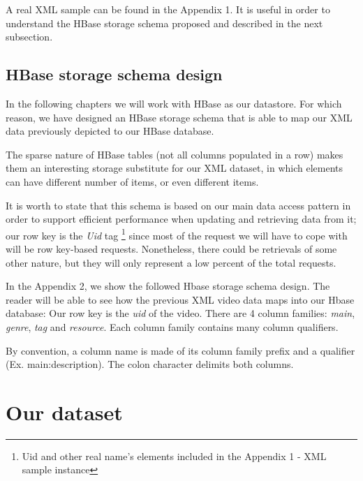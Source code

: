 \bigskip

A real XML sample can be found in the Appendix 1. It is useful in order to understand the HBase storage schema proposed and described in the next subsection.

\subsection{HBase storage schema design}

In the following chapters we will work with HBase as our datastore. For which reason, we have designed an HBase storage schema that is able to map our XML data previously depicted to our HBase database. 

\par
The sparse nature of HBase tables (not all columns populated in a row) makes them an interesting storage substitute for our XML dataset, in which elements can have different number of items, or even different items.

\par
It is worth to state that this schema is based on our main data access pattern in order to support efficient performance when updating and retrieving data from it; our row key is the \textit{Uid} tag \footnote{Uid and other real name's elements included in the Appendix 1 -  XML sample instance} since most of the request we will have to cope with will be row key-based requests. Nonetheless, there could be retrievals of some other nature, but they will only represent a low percent of the total requests.
\bigskip

In the Appendix 2, we show the followed Hbase storage schema design. The reader will be able to see how the previous XML video data maps into our Hbase database: Our row key is the \textit{uid} of the video. There are 4 column families: \textit{main}, \textit{genre}, \textit{tag} and \textit{resource}. Each column family contains many column qualifiers.
\par
By convention, a column name is made of its column family prefix and a qualifier (Ex. main:description). The colon character delimits both columns.

\section{Our dataset}



